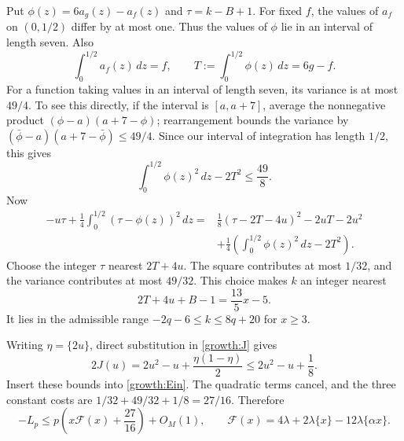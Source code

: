 Put \(\phi(z)=6a_g(z)-a_f(z)\) and
\(\tau=k-B+1\). For fixed \(f\), the values of \(a_f\) on
\((0,1/2)\) differ by at most one. Thus the values of \(\phi\)
lie in an interval of length seven. Also
\[
 \int_0^{1/2}a_f(z)\,dz=f,\qquad
 T:=\int_0^{1/2}\phi(z)\,dz=6g-f.
\]
For a function taking values in an interval of length seven, its
variance is at most \(49/4\). To see this directly, if the interval
is \([a,a+7]\), average the nonnegative product
\((\phi-a)(a+7-\phi)\); rearrangement bounds the variance by
\((\bar\phi-a)(a+7-\bar\phi)\le49/4\).
Since our interval of integration has length \(1/2\), this gives
\[
 \int_0^{1/2}\phi(z)^2\,dz-2T^2\le\frac{49}{8}.
\]
Now
\begin{align*}
 -u\tau+\frac14\int_0^{1/2}(\tau-\phi(z))^2\,dz
 ={}&\frac18(\tau-2T-4u)^2-2uT-2u^2\\
 &+\frac14\left(\int_0^{1/2}\phi(z)^2\,dz-2T^2\right).
\end{align*}
Choose the integer \(\tau\) nearest \(2T+4u\). The square contributes
at most \(1/32\), and the variance contributes at most \(49/32\).
This choice makes \(k\) an integer nearest
\[
 2T+4u+B-1=\frac{13}{5}x-5.
\]
It lies in the admissible range \(-2q-6\le k\le8q+20\)
for \(x\ge3\).

Writing \(\eta=\{2u\}\), direct substitution in \eqref{growth:J} gives
\[
 2J(u)=2u^2-u+\frac{\eta(1-\eta)}2
 \le2u^2-u+\frac18.
\]
Insert these bounds into \eqref{growth:Ein}. The quadratic terms
cancel, and the three constant costs are
\(1/32+49/32+1/8=27/16\). Therefore
\begin{equation}\label{growth:tail-profile}
 -L_p\le p\left(x\mathcal F(x)+\frac{27}{16}\right)+O_M(1),
 \qquad
 \mathcal F(x)=4\lambda+2\lambda\{x\}
                       -12\lambda\{\alpha x\}.
\end{equation}

